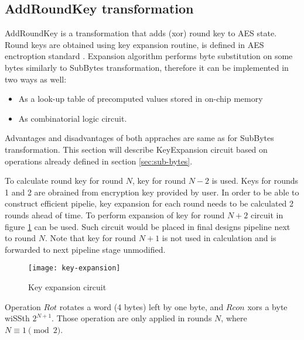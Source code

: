 \subsection{AddRoundKey transformation}

AddRoundKey is a transformation that adds (xor) round key to AES state. Round keys are obtained using key expansion routine, is defined in AES enctroption standard \cite{aes-standard}. Expansion algorithm performs byte substitution on some bytes similarly to SubBytes transformation, therefore it can be implemented in two ways as well:
\begin{itemize}[nolistsep]
\item As a look-up table of precomputed values stored in on-chip memory
\item As combinatorial logic circuit.
\end{itemize}
Advantages and disadvantages of both appraches are same as for SubBytes transformation. This section will describe KeyExpansion circuit based on operations already defined in section \ref{sec:sub-bytes}.

To calculate round key for round $N$, key for round $N - 2$ is used. Keys for rounds 1 and 2 are obrained from encryption key provided by user. In order to be able to construct efficient pipelie, key expansion for each round needs to be calculated 2 rounds ahead of time. To perform expansion of key for round $N + 2$ circuit in figure \ref{fig:key-expansion} can be used. Such circuit would be placed in final designs pipeline next to round $N$. Note that key for round $N + 1$ is not used in calculation and is forwarded to next pipeline stage unmodified.

\begin{figure}
\label{fig:key-expansion}
\centering
\texttt{[image: key-expansion]}
\caption{Key expansion circuit}
\end{figure}


Operation $Rot$ rotates a word (4 bytes) left by one byte, and $Rcon$ xors a byte wiSSth $2^{N + 1}$. Those operation are only applied in rounds $N$, where $N \equiv 1 \pmod{2}$.

